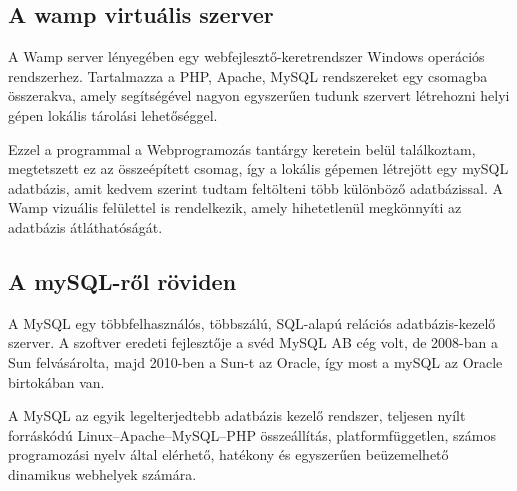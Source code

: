 \subsection{A wamp virtuális szerver}\label{subsec:ALTALAMISMERT:mysql:virtuals}
A Wamp server lényegében egy webfejlesztő-keretrendszer Windows operációs rendszerhez. Tartalmazza a PHP, Apache, MySQL rendszereket egy csomagba összerakva, amely segítségével nagyon egyszerűen tudunk szervert létrehozni helyi gépen lokális tárolási lehetőséggel.

Ezzel a programmal a Webprogramozás tantárgy keretein belül találkoztam, megtetszett ez az összeépített csomag, így a lokális gépemen létrejött egy mySQL adatbázis, amit kedvem szerint tudtam feltölteni több különböző adatbázissal. A Wamp vizuális felülettel is rendelkezik, amely hihetetlenül megkönnyíti az adatbázis átláthatóságát.
\subsection{A mySQL-ről röviden}\label{subsec:ALTALAMISMERT:mysql:mysqlrolroviden}
A MySQL egy többfelhasználós, többszálú, SQL-alapú relációs adatbázis-kezelő szerver.
A szoftver eredeti fejlesztője a svéd MySQL AB cég volt, de 2008-ban a Sun felvásárolta, majd 2010-ben a Sun-t  az Oracle, így most a mySQL az Oracle birtokában van.

A MySQL az egyik legelterjedtebb adatbázis kezelő rendszer, teljesen nyílt forráskódú Linux–Apache–MySQL–PHP összeállítás, platformfüggetlen, számos programozási nyelv által elérhető, hatékony és egyszerűen beüzemelhető dinamikus webhelyek számára. 
